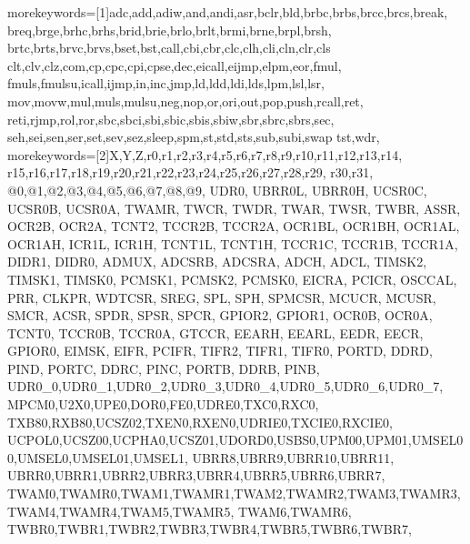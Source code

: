 

% 







{
   morekeywords=[1]{adc,add,adiw,and,andi,asr,bclr,bld,brbc,brbs,brcc,brcs,break,
   					breq,brge,brhc,brhs,brid,brie,brlo,brlt,brmi,brne,brpl,brsh,
                    brtc,brts,brvc,brvs,bset,bst,call,cbi,cbr,clc,clh,cli,cln,clr,cls
                    clt,clv,clz,com,cp,cpc,cpi,cpse,dec,eicall,eijmp,elpm,eor,fmul,
                    fmuls,fmulsu,icall,ijmp,in,inc,jmp,ld,ldd,ldi,lds,lpm,lsl,lsr,
                    mov,movw,mul,muls,mulsu,neg,nop,or,ori,out,pop,push,rcall,ret,
                    reti,rjmp,rol,ror,sbc,sbci,sbi,sbic,sbis,sbiw,sbr,sbrc,sbrs,sec,
                    seh,sei,sen,ser,set,sev,sez,sleep,spm,st,std,sts,sub,subi,swap
                    tst,wdr},%
 morekeywords=[2]{X,Y,Z,r0,r1,r2,r3,r4,r5,r6,r7,r8,r9,r10,r11,r12,r13,r14,
                r15,r16,r17,r18,r19,r20,r21,r22,r23,r24,r25,r26,r27,r28,r29,
                r30,r31,
                @0,@1,@2,@3,@4,@5,@6,@7,@8,@9,
                 UDR0, UBRR0L, UBRR0H, UCSR0C, UCSR0B, UCSR0A, TWAMR, TWCR, TWDR,
				TWAR, TWSR, TWBR, ASSR, OCR2B, OCR2A, TCNT2, TCCR2B, TCCR2A, OCR1BL,
				OCR1BH, OCR1AL, OCR1AH, ICR1L, ICR1H, TCNT1L, TCNT1H, TCCR1C, TCCR1B,
				TCCR1A, DIDR1, DIDR0, ADMUX, ADCSRB, ADCSRA, ADCH, ADCL, TIMSK2,
				TIMSK1, TIMSK0, PCMSK1, PCMSK2, PCMSK0, EICRA, PCICR, OSCCAL, PRR,
				CLKPR, WDTCSR, SREG, SPL, SPH, SPMCSR, MCUCR, MCUSR, SMCR, ACSR, 
				SPDR, SPSR, SPCR, GPIOR2, GPIOR1, OCR0B, OCR0A, TCNT0, TCCR0B, TCCR0A,
				GTCCR, EEARH, EEARL, EEDR, EECR, GPIOR0, EIMSK, EIFR, PCIFR, TIFR2,
				TIFR1, TIFR0, PORTD, DDRD, PIND, PORTC, DDRC, PINC, PORTB, DDRB, PINB,
   				 UDR0_0,UDR0_1,UDR0_2,UDR0_3,UDR0_4,UDR0_5,UDR0_6,UDR0_7,
				MPCM0,U2X0,UPE0,DOR0,FE0,UDRE0,TXC0,RXC0,
				TXB80,RXB80,UCSZ02,TXEN0,RXEN0,UDRIE0,TXCIE0,RXCIE0,
				UCPOL0,UCSZ00,UCPHA0,UCSZ01,UDORD0,USBS0,UPM00,UPM01,UMSEL00,UMSEL0,UMSEL01,UMSEL1,
				UBRR8,UBRR9,UBRR10,UBRR11,
				UBRR0,UBRR1,UBRR2,UBRR3,UBRR4,UBRR5,UBRR6,UBRR7,
				TWAM0,TWAMR0,TWAM1,TWAMR1,TWAM2,TWAMR2,TWAM3,TWAMR3,TWAM4,TWAMR4,TWAM5,TWAMR5,
				TWAM6,TWAMR6,
				TWBR0,TWBR1,TWBR2,TWBR3,TWBR4,TWBR5,TWBR6,TWBR7,
}}
